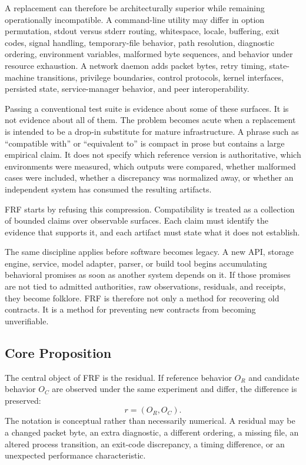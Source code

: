 \documentclass[11pt,a4paper]{article}
\newcommand{\frf}{\textsc{FRF}}
\begin{document}
A replacement can therefore be architecturally superior while remaining operationally incompatible. A command-line utility may differ in option permutation, stdout versus stderr routing, whitespace, locale, buffering, exit codes, signal handling, temporary-file behavior, path resolution, diagnostic ordering, environment variables, malformed byte sequences, and behavior under resource exhaustion. A network daemon adds packet bytes, retry timing, state-machine transitions, privilege boundaries, control protocols, kernel interfaces, persisted state, service-manager behavior, and peer interoperability.

Passing a conventional test suite is evidence about some of these surfaces. It is not evidence about all of them. The problem becomes acute when a replacement is intended to be a drop-in substitute for mature infrastructure. A phrase such as ``compatible with'' or ``equivalent to'' is compact in prose but contains a large empirical claim. It does not specify which reference version is authoritative, which environments were measured, which outputs were compared, whether malformed cases were included, whether a discrepancy was normalized away, or whether an independent system has consumed the resulting artifacts.

\frf{} starts by refusing this compression. Compatibility is treated as a collection of bounded claims over observable surfaces. Each claim must identify the evidence that supports it, and each artifact must state what it does not establish.

The same discipline applies before software becomes legacy. A new API, storage engine, service, model adapter, parser, or build tool begins accumulating behavioral promises as soon as another system depends on it. If those promises are not tied to admitted authorities, raw observations, residuals, and receipts, they become folklore. \frf{} is therefore not only a method for recovering old contracts. It is a method for preventing new contracts from becoming unverifiable.

\subsection{Core Proposition}
The central object of \frf{} is the residual. If reference behavior \(O_R\) and candidate behavior \(O_C\) are observed under the same experiment and differ, the difference is preserved:
\[
  r = (O_R, O_C).
\]
The notation is conceptual rather than necessarily numerical. A residual may be a changed packet byte, an extra diagnostic, a different ordering, a missing file, an altered process transition, an exit-code discrepancy, a timing difference, or an unexpected performance characteristic.
\end{document}
